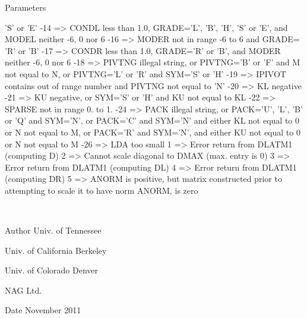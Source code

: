 \begin{DoxyParams}[1]{Parameters}
\begin{DoxyVerb}
                  'S' or 'E'
           -14 => CONDL less than 1.0, GRADE='L', 'B', 'H', 'S' or 'E',
                  and MODEL neither -6, 0 nor 6
           -16 => MODER not in range -6 to 6 and GRADE= 'R' or 'B'
           -17 => CONDR less than 1.0, GRADE='R' or 'B', and
                  MODER neither -6, 0 nor 6
           -18 => PIVTNG illegal string, or PIVTNG='B' or 'F' and
                  M not equal to N, or PIVTNG='L' or 'R' and SYM='S'
                  or 'H'
           -19 => IPIVOT contains out of range number and
                  PIVTNG not equal to 'N'
           -20 => KL negative
           -21 => KU negative, or SYM='S' or 'H' and KU not equal to KL
           -22 => SPARSE not in range 0. to 1.
           -24 => PACK illegal string, or PACK='U', 'L', 'B' or 'Q'
                  and SYM='N', or PACK='C' and SYM='N' and either KL
                  not equal to 0 or N not equal to M, or PACK='R' and
                  SYM='N', and either KU not equal to 0 or N not equal
                  to M
           -26 => LDA too small
             1 => Error return from DLATM1 (computing D)
             2 => Cannot scale diagonal to DMAX (max. entry is 0)
             3 => Error return from DLATM1 (computing DL)
             4 => Error return from DLATM1 (computing DR)
             5 => ANORM is positive, but matrix constructed prior to
                  attempting to scale it to have norm ANORM, is zero\end{DoxyVerb}
 \\
\hline
\end{DoxyParams}
\begin{DoxyAuthor}{Author}
Univ. of Tennessee 

Univ. of California Berkeley 

Univ. of Colorado Denver 

N\+A\+G Ltd. 
\end{DoxyAuthor}
\begin{DoxyDate}{Date}
November 2011 
\end{DoxyDate}
\hypertarget{group__double__matgen_gadf4ba9c37cb5f67132e71433efa825d4}{}

